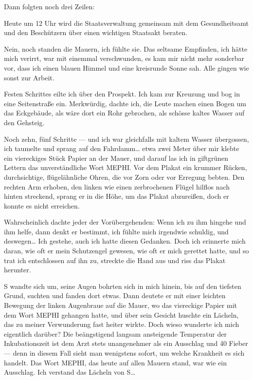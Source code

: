 Dann folgten noch drei Zeilen:

Heute um 12 Uhr wird die Staatsverwaltung gemeinsam mit dem
Gesundheitsamt und den Beschützern über einen wichtigen Staatsakt
beraten.

Nein, noch standen die Mauern, ich fühlte sie. Das seltsame
Empfinden, ich hätte mich verirrt, war mit einemmal verschwunden,
es kam mir nicht mehr sonderbar vor, dass ich einen blauen Himmel
und eine kreisrunde Sonne sah. Alle gingen wie sonst zur Arbeit.

Festen Schrittes eilte ich über den Prospekt. Ich kam zur Kreuzung
und bog in eine Seitenstraße ein. Merkwürdig, dachte ich, die Leute
machen einen Bogen um das Eckgebäude, als wäre dort ein Rohr
gebrochen, als schösse kaltes Wasser auf den Gehsteig.

Noch zehn, fünf Schritte — und ich war gleichfalls mit kaltem
Wasser übergossen, ich taumelte und sprang auf den Fahrdamm\ldots{} etwa
zwei Meter über mir klebte ein viereckiges Stück Papier an der
Mauer, und darauf las ich in giftgrünen Lettern das unverständliche
Wort MEPHI. Vor dem Plakat ein krummer Rücken, durchsichtige,
flügelähnliche Ohren, die vor Zorn oder vor Erregung bebten. Den
rechten Arm erhoben, den linken wie einen zerbrochenen Flügel
hilflos nach hinten streckend, sprang er in die Höhe, um das Plakat
abzureißen, doch er konnte es nicht erreichen.

Wahrscheinlich dachte jeder der Vorübergehenden: Wenn ich zu ihm
hingehe und ihm helfe, dann denkt er bestimmt, ich fühlte mich
irgendwie schuldig, und deswegen\ldots{} Ich gestehe, auch ich hatte
diesen Gedanken. Doch ich erinnerte mich daran, wie oft er mein
Schutzengel gewesen, wie oft er mich gerettet hatte, und so trat
ich entschlossen auf ihn zu, streckte die Hand aus und riss das
Plakat herunter.

S wandte sich um, seine Augen bohrten sich in mich hinein, bis auf
den tiefsten Grund, suchten und fanden dort etwas. Dann deutete er
mit einer leichten Bewegung der linken Augenbraue auf die Mauer, wo
das viereckige Papier mit dem Wort MEPHI gehangen hatte, und über
sein Gesicht huschte ein Lächeln, das zu meiner Verwunderung fast
heiter wirkte. Doch wieso wunderte ich mich eigentlich darüber? Die
beängstigend langsam ansteigende Temperatur der Inkubationszeit ist
dem Arzt stets unangenehmer als ein Ausschlag und 40\textcelsius{} Fieber — denn
in diesem Fall sieht man wenigstens sofort, um welche Krankheit es
sich handelt. Das Wort MEPHI, das heute auf allen Mauern stand, war
wie ein Ausschlag. Ich verstand das Lächeln von S\ldots{}

